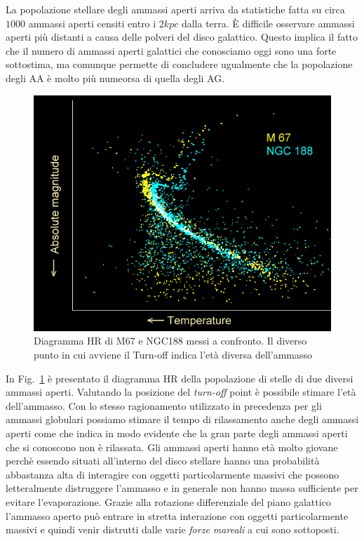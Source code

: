 La popolazione stellare degli ammassi aperti arriva da statistiche fatta su circa $1000$ ammassi aperti censiti entro i $2kpc$ dalla terra. \`E difficile osservare ammassi aperti pi\`u distanti a causa delle polveri del disco galattico. Questo implica il fatto che il numero di ammassi aperti galattici che conosciamo oggi sono una forte sottostima, ma comunque permette di concludere ugualmente che la popolazione degli AA \`e molto pi\`u numeorsa di quella degli AG.
\begin{figure}
		\centering
		\includegraphics[scale=0.4]{turnM67.png}
		\caption{Diagramma HR di M67 e NGC188 messi a confronto. Il diverso punto in cui avviene il Turn-off indica l'et\`a diversa dell'ammasso}
		\label{ETA:AA}
\end{figure}

In Fig.~\ref{ETA:AA} \`e presentato il diagramma HR della popolazione di stelle di due diversi ammassi aperti. Valutando la posizione del \emph{turn-off} point \`e possibile stimare l'et\`a dell'ammasso. Con lo stesso ragionamento utilizzato in precedenza per gli ammassi globulari possiamo stimare il tempo di rilassamento anche degli ammassi aperti come
che indica in modo evidente che la gran parte degli ammassi aperti che si conoscono non \`e rilassata.
Gli ammassi aperti hanno et\`a molto giovane perch\`e essendo situati all'interno del disco stellare hanno una probabilit\`a abbastanza alta di interagire con oggetti particolarmente massivi che possono letteralmente distruggere l'ammasso e in generale non hanno massa sufficiente per evitare l'evaporazione. Grazie alla rotazione differenziale del piano galattico l'ammasso aperto pu\`o entrare in stretta interazione con oggetti particolarmente massivi e quindi venir distrutti dalle varie \emph{forze mareali} a cui sono sottoposti.
